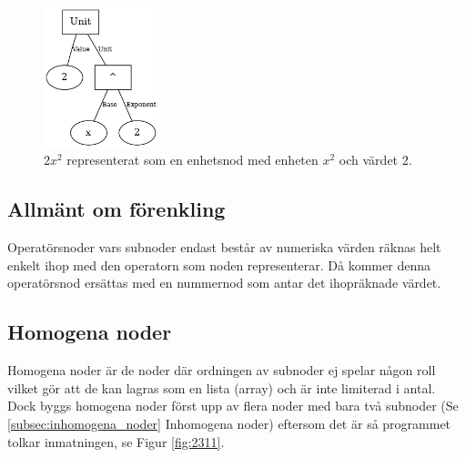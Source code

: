 \documentclass[12pt,a4paper]{article}
\begin{document}
\begin{figure}[h]
  \centering
  \includegraphics[width=0.3\textwidth]{image25}
  \caption{\(2x^{2}\) representerat som en enhetsnod med enheten \(x^{2}\) och värdet \(2\).}
  \label{fig:2132}
\end{figure}
\subsection{Allmänt om förenkling}
Operatörsnoder vars subnoder endast består av numeriska värden räknas helt enkelt ihop med den operatorn som noden representerar. Då kommer denna operatörsnod ersättas med en nummernod som antar det ihopräknade värdet.
\subsection{Homogena noder}
Homogena noder är de noder där ordningen av subnoder ej spelar någon roll vilket gör att de kan lagras som en lista (array) och är inte limiterad i antal. Dock byggs homogena noder först upp av flera noder med bara två subnoder (Se \ref{subsec:inhomogena_noder} Inhomogena noder) eftersom det är så programmet tolkar inmatningen, se Figur \ref{fig:2311}.
\end{document}
